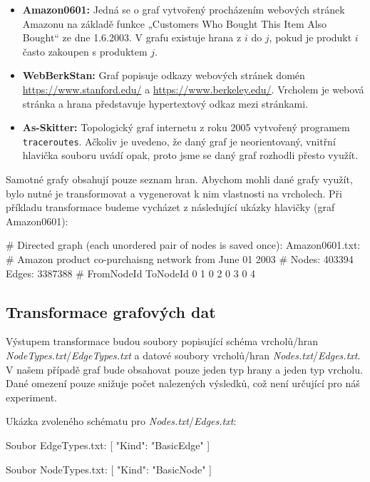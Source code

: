 \begin{itemize}

\item \textbf{Amazon0601:} Jedná se o graf vytvořený procházením webových stránek Amazonu na základě funkce „Customers Who Bought This Item Also Bought“ ze dne 1.6.2003. V grafu existuje hrana z $i$ do $j$, pokud je produkt $i$ často zakoupen s produktem $j$.

\item \textbf{WebBerkStan:} Graf popisuje odkazy webových stránek domén \url{https://www.stanford.edu/} a \url{https://www.berkeley.edu/}. Vrcholem je webová stránka a hrana představuje hypertextový odkaz mezi stránkami.

\item \textbf{As-Skitter:} Topologický graf internetu z roku 2005 vytvořený programem \verb+traceroutes+. Ačkoliv je uvedeno, že daný graf je neorientovaný, vnitřní hlavička souboru uvádí opak, proto jsme se daný graf rozhodli přesto využít.

\end{itemize}

Samotné grafy obsahují pouze seznam hran. Abychom mohli dané grafy využít, bylo nutné je transformovat a vygenerovat k nim vlastnosti na vrcholech. 
Při příkladu transformace budeme vycházet z následující ukázky hlavičky (graf Amazon0601):

\begin{code}
# Directed graph (each unordered pair of nodes is saved once): 
    Amazon0601.txt: 
# Amazon product co-purchaisng network from June 01 2003
# Nodes: 403394 Edges: 3387388
# FromNodeId	ToNodeId
0	1
0	2
0	3
0	4
\end{code}

\subsection{Transformace grafových dat}

Výstupem transformace budou soubory popisující schéma vrcholů/hran \textit{NodeTypes.txt}/\textit{EdgeTypes.txt} a datové soubory vrcholů/hran \textit{Nodes.txt}/\textit{Edges.txt}.
V našem případě graf bude obsahovat pouze jeden typ hrany a jeden typ vrcholu. 
Dané omezení pouze snižuje počet nalezených výsledků, což není určující pro náš experiment. 

Ukázka zvoleného schématu pro \textit{Nodes.txt}/\textit{Edges.txt}:
\begin{code}
Soubor EdgeTypes.txt:
[
{ "Kind": "BasicEdge" }
]

Soubor NodeTypes.txt:
[ 
{ "Kind": "BasicNode" }
]

\end{code}

